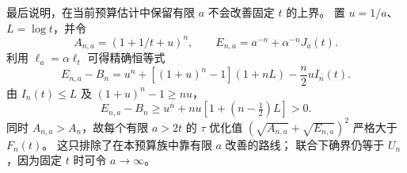 最后说明，在当前预算估计中保留有限 $a$ 不会改善固定 $t$ 的上界。
置 $u=1/a$、$L=\log t$，并令
\[
 A_{n,a}=(1+1/t+u)^n,\qquad E_{n,a}=a^{-n}+\alpha^{-n}J_a(t).
\]
利用 $\ell_a=\alpha\ell_t$ 可得精确恒等式
\[
 E_{n,a}-B_n
 =u^n+[(1+u)^n-1](1+nL)-\frac n2uI_n(t).
\]
由 $I_n(t)\le L$ 及 $(1+u)^n-1\ge nu$，
\[
 E_{n,a}-B_n\ge u^n+nu[1+(n-\tfrac12)L]>0.
\]
同时 $A_{n,a}>A_n$，故每个有限 $a>2t$ 的 $\tau$ 优化值
$(\sqrt{A_{n,a}}+\sqrt{E_{n,a}})^2$ 严格大于 $F_n(t)$。
这只排除了在本预算族中靠有限 $a$ 改善的路线；
联合下确界仍等于 $U_n$，因为固定 $t$ 时可令 $a\to\infty$。
